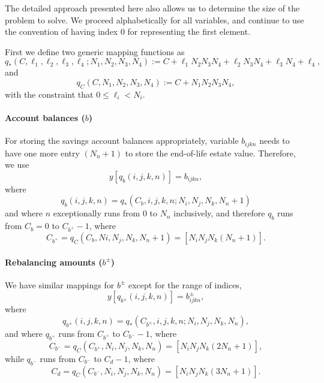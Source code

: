 \documentclass{article}[fleqn,12pt]
\begin{document}
The detailed approach presented here also allows us to determine the size of the problem to solve.
We proceed alphabetically for all variables, and continue to use the convention of having
index 0 for representing the first element.

First we define two generic mapping functions as
\begin{equation}
	q_*(C, \ell_1, \ell_2, \ell_3, \ell_4; N_1, N_2, N_3, N_4) :=
	C + \ell_1N_2N_3N_4 + \ell_2N_3N_4 + \ell_3N_4 + \ell_4,
\end{equation}
and
\begin{equation}
	q_C(C, N_1, N_2, N_3, N_4) :=
	C + N_1N_2N_3N_4,
\end{equation}
with the constraint that $0 \le \ell_i < N_i$.

\paragraph*{Account balances (\boldmath$b$)}
For storing the savings account balances appropriately, variable $b_{ijkn}$ needs to have one
more entry $(N_n + 1)$ to
store the end-of-life estate value. Therefore, we use
\begin{equation}
	y[q_b(i, j, k, n)] = b_{ijkn},
\end{equation}
where
\begin{equation}
	\label{Eq:Extra}
	q_b(i, j, k, n) = q_*(C_b, i, j, k, n; N_i, N_j, N_k, N_n+1)
\end{equation}
and where $n$ exceptionally runs from 0 to $N_n$ inclusively, and therefore
$q_b$ runs from $C_b = 0$ to $C_{b^+} - 1$,
where
\[
	C_{b^+} = q_C(C_b, Ni, N_j, N_k, N_n+1) = [N_i N_j N_k (N_n+1)].
\]

\paragraph*{Rebalancing amounts (\boldmath$b^\pm$)}
We have similar mappings for $b^\pm$ except for the range of indices,
\begin{equation}
	y[q_{b^\pm}(i, j, k, n)] = b^\pm_{ijkn},
\end{equation}
where
\begin{equation}
	q_{b^\pm}(i, j, k, n) = q_*(C_{b^\pm}, i, j, k, n; N_i, N_j, N_k, N_n),
\end{equation}
and where
$q_{b^+}$ runs from $C_{b^+}$ to $C_{b^-} - 1$,
where
\[
	C_{b^-} = q_C(C_{b^+}, N_i, N_j, N_k, N_n) = [N_i N_j N_k (2N_n + 1)],
\]
while
$q_{b^-}$ runs from $C_{b^-}$ to $C_d - 1$, where
\[
	C_d = q_C(C_{b^-}, N_i, N_j, N_k, N_n) = [N_i N_j N_k  (3N_n + 1)].
\]
\end{document}
